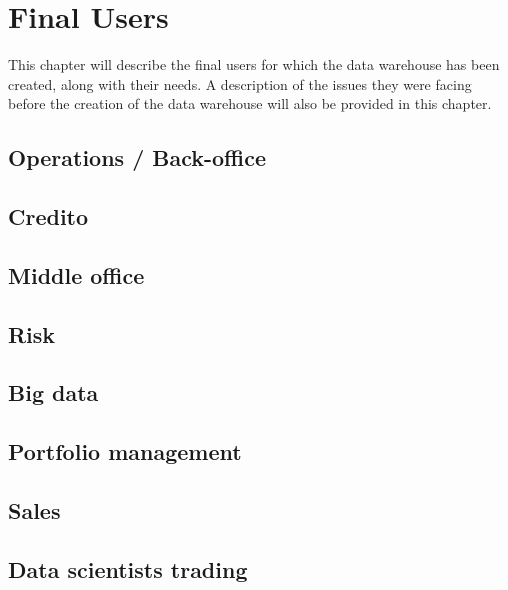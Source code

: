 \chapter{Final Users} \label{section:users}
    This chapter will describe the final users for which the data warehouse has been created, along with their needs.
    A description of the issues they were facing before the creation of the data warehouse will also be provided in this chapter. 
    
    \section{Operations / Back-office} \label{section:users:operations}
        
    \section{Credito} \label{section:users:credit}
    \section{Middle office} \label{section:users:middle office}
    \section{Risk} \label{section:users:risk}
    \section{Big data} \label{section:users:big_data}
        
    \section{Portfolio management} \label{section:users:portfolio_management}
    \section{Sales} \label{section:users:sales}
    \section{Data scientists trading} \label{section:users:trading}
